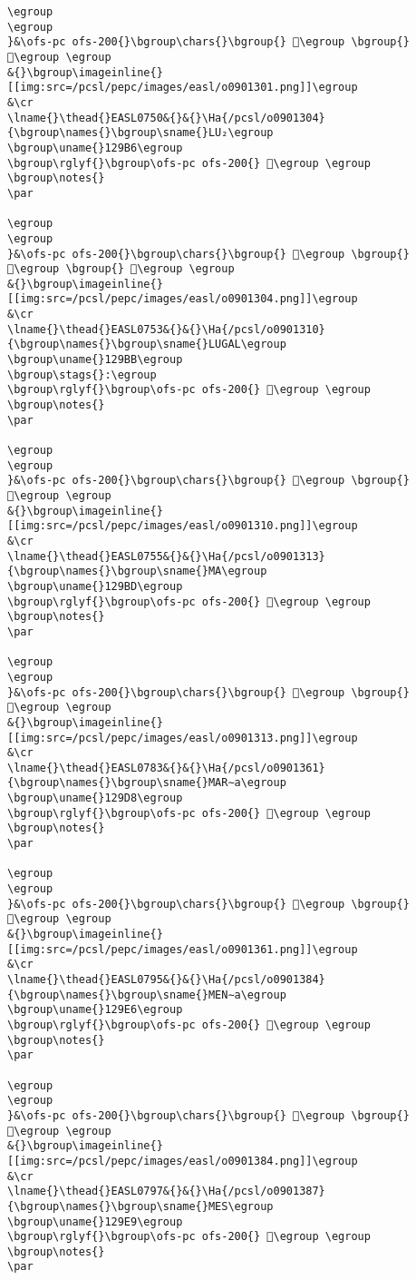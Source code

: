 \begin{verbatim}
\egroup
\egroup
}&\ofs-pc ofs-200{}\bgroup\chars{}\bgroup{} 𒦳\egroup \bgroup{} 𒦴\egroup \egroup
&{}\bgroup\imageinline{}[[img:src=/pcsl/pepc/images/easl/o0901301.png]]\egroup
&\cr
\lname{}\thead{}EASL0750&{}&{}\Ha{/pcsl/o0901304}{\bgroup\names{}\bgroup\sname{}LU₂\egroup
\bgroup\uname{}129B6\egroup
\bgroup\rglyf{}\bgroup\ofs-pc ofs-200{} 𒦶\egroup \egroup
\bgroup\notes{}
\par 

\egroup
\egroup
}&\ofs-pc ofs-200{}\bgroup\chars{}\bgroup{} 𒦹\egroup \bgroup{} 𒦶\egroup \bgroup{} 𒦸\egroup \egroup
&{}\bgroup\imageinline{}[[img:src=/pcsl/pepc/images/easl/o0901304.png]]\egroup
&\cr
\lname{}\thead{}EASL0753&{}&{}\Ha{/pcsl/o0901310}{\bgroup\names{}\bgroup\sname{}LUGAL\egroup
\bgroup\uname{}129BB\egroup
\bgroup\stags{}:\egroup
\bgroup\rglyf{}\bgroup\ofs-pc ofs-200{} 𒦻\egroup \egroup
\bgroup\notes{}
\par 

\egroup
\egroup
}&\ofs-pc ofs-200{}\bgroup\chars{}\bgroup{} 𒦺\egroup \bgroup{} 𒦻\egroup \egroup
&{}\bgroup\imageinline{}[[img:src=/pcsl/pepc/images/easl/o0901310.png]]\egroup
&\cr
\lname{}\thead{}EASL0755&{}&{}\Ha{/pcsl/o0901313}{\bgroup\names{}\bgroup\sname{}MA\egroup
\bgroup\uname{}129BD\egroup
\bgroup\rglyf{}\bgroup\ofs-pc ofs-200{} 𒦽\egroup \egroup
\bgroup\notes{}
\par 

\egroup
\egroup
}&\ofs-pc ofs-200{}\bgroup\chars{}\bgroup{} 𒦽\egroup \bgroup{} 𒧀\egroup \egroup
&{}\bgroup\imageinline{}[[img:src=/pcsl/pepc/images/easl/o0901313.png]]\egroup
&\cr
\lname{}\thead{}EASL0783&{}&{}\Ha{/pcsl/o0901361}{\bgroup\names{}\bgroup\sname{}MAR∼a\egroup
\bgroup\uname{}129D8\egroup
\bgroup\rglyf{}\bgroup\ofs-pc ofs-200{} 𒧘\egroup \egroup
\bgroup\notes{}
\par 

\egroup
\egroup
}&\ofs-pc ofs-200{}\bgroup\chars{}\bgroup{} 𒧘\egroup \bgroup{} 𒧚\egroup \egroup
&{}\bgroup\imageinline{}[[img:src=/pcsl/pepc/images/easl/o0901361.png]]\egroup
&\cr
\lname{}\thead{}EASL0795&{}&{}\Ha{/pcsl/o0901384}{\bgroup\names{}\bgroup\sname{}MEN∼a\egroup
\bgroup\uname{}129E6\egroup
\bgroup\rglyf{}\bgroup\ofs-pc ofs-200{} 𒧦\egroup \egroup
\bgroup\notes{}
\par 

\egroup
\egroup
}&\ofs-pc ofs-200{}\bgroup\chars{}\bgroup{} 𒧥\egroup \bgroup{} 𒧦\egroup \egroup
&{}\bgroup\imageinline{}[[img:src=/pcsl/pepc/images/easl/o0901384.png]]\egroup
&\cr
\lname{}\thead{}EASL0797&{}&{}\Ha{/pcsl/o0901387}{\bgroup\names{}\bgroup\sname{}MES\egroup
\bgroup\uname{}129E9\egroup
\bgroup\rglyf{}\bgroup\ofs-pc ofs-200{} 𒧩\egroup \egroup
\bgroup\notes{}
\par 


\end{verbatim}
